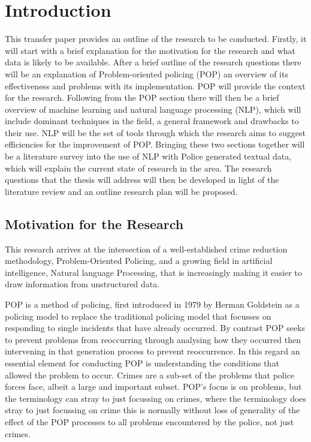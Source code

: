 \chapter{Introduction}

This transfer paper provides an outline of the research to be conducted. Firstly, it will start with a brief explanation for the motivation for the research and what data is likely to be available. After a brief outline of the research questions there will be an explanation of Problem-oriented policing (POP) an overview of its effectiveness and problems with its implementation. POP will provide the context for the research. Following from the POP section there will then be a brief overview of machine learning and natural language processing (NLP), which will include dominant techniques in the field, a general framework and drawbacks to their use. NLP will be the set of tools through which the research aims to suggest efficiencies for the improvement of POP. Bringing these two sections together will be a literature survey into the use of NLP with Police generated textual data, which will explain the current state of research in the area. The research questions that the thesis will address will then be developed in light of the literature review and an outline research plan will be proposed.

\section{Motivation for the Research} 

This research arrives at the intersection of a well-established crime reduction methodology, Problem-Oriented Policing, and a growing field in artificial intelligence, Natural language Processing, that is increasingly making it easier to draw information from unstructured data. 

POP is a method of policing, first introduced in 1979 by Herman Goldstein \parencite{gold79} as a policing model to replace the traditional policing model that focusses on responding to single incidents that have already occurred. By contrast POP seeks to prevent  problems from reoccurring through analysing how they occurred then intervening in that generation process to prevent reoccurrence. In this regard an essential element for conducting POP is understanding the conditions that allowed the problem to occur. Crimes are a sub-set of the problems that police forces face, albeit a large and important subset. POP's focus is on problems, but the terminology can stray to just focussing on crimes, where the terminology does stray to just focussing on crime this is normally without loss of generality of the effect of the POP processes to all problems encountered by the police, not just crimes. 

